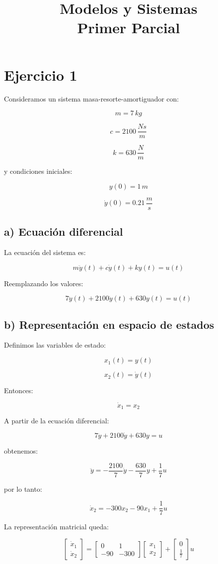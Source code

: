 \documentclass[12pt,a4paper]{article}
\title{Modelos y Sistemas\\
Primer Parcial}
\author{}
\date{}
\begin{document}
\maketitle

\section*{Ejercicio 1}

Consideramos un sistema masa-resorte-amortiguador con:

\[
m = 7\,kg
\]

\[
c = 2100\,\frac{Ns}{m}
\]

\[
k = 630\,\frac{N}{m}
\]

y condiciones iniciales:

\[
y(0)=1\,m
\]

\[
\dot{y}(0)=0.21\,\frac{m}{s}
\]

\subsection*{a) Ecuación diferencial}

La ecuación del sistema es:

\[
m\ddot{y}(t)+c\dot{y}(t)+ky(t)=u(t)
\]

Reemplazando los valores:

\[
7\ddot{y}(t)+2100\dot{y}(t)+630y(t)=u(t)
\]

\subsection*{b) Representación en espacio de estados}

Definimos las variables de estado:

\[
x_1(t)=y(t)
\]

\[
x_2(t)=\dot{y}(t)
\]

Entonces:

\[
\dot{x}_1=x_2
\]

A partir de la ecuación diferencial:

\[
7\ddot{y}+2100\dot{y}+630y=u
\]

obtenemos:

\[
\ddot{y}
=
-\frac{2100}{7}\dot{y}
-\frac{630}{7}y
+\frac{1}{7}u
\]

por lo tanto:

\[
\dot{x}_2
=
-300x_2-90x_1+\frac{1}{7}u
\]

La representación matricial queda:

\[
\begin{bmatrix}
\dot{x}_1\\
\dot{x}_2
\end{bmatrix}
=
\begin{bmatrix}
0 & 1\\
-90 & -300
\end{bmatrix}
\begin{bmatrix}
x_1\\
x_2
\end{bmatrix}
+
\begin{bmatrix}
0\\
\frac{1}{7}
\end{bmatrix}u
\]
\end{document}

